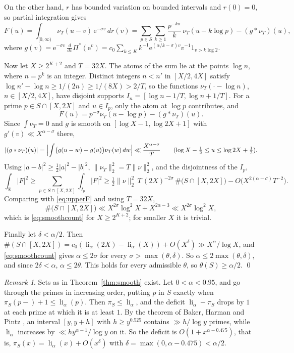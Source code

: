 \documentclass[11pt]{amsart}
\theoremstyle{remark}
\newtheorem{remark}[lemma]{Remark}
\numberwithin{equation}{section}
\newcommand{\R}{\mathbb{R}}
\newcommand{\e}{\mathrm{e}}
\DeclareMathOperator{\li}{li}
\begin{document}
On the other hand, $r$ has bounded variation on bounded intervals and $r(0)=0$, so partial integration gives
\[
F(u)=\int_{[0,\infty)}\nu_T(u-v)\,\e^{-\sigma v}\,dr(v)=\sum_{p\in S}\sum_{k\ge1}\frac{p^{-k\sigma}}{k}\,\nu_T(u-k\log p)-(g*\nu_T)(u),
\]
where $g(v)=\e^{-\sigma v}\,\frac{d}{dv}\Pi^*(\e^v)=c_0\sum_{k\le K}k^{-1}\e^{(\alpha/k-\sigma)v}v^{-1}1_{v>k\log2}$.

Now let $X\ge 2^{K+2}$ and $T=32X$. The atoms of the sum lie at the points $\log n$, where $n=p^k$ is an integer. Distinct integers $n<n'$ in $[X/2,4X]$ satisfy $\log n'-\log n\ge 1/(2n)\ge 1/(8X)>2/T$, so the functions $\nu_T(\cdot-\log n)$, $n\in[X/2,4X]$, have disjoint supports $I_n=[\log n-1/T,\log n+1/T]$. For a prime $p\in S\cap[X,2X]$ and $u\in I_p$, only the atom at $\log p$ contributes, and
\[
F(u)=p^{-\sigma}\nu_T(u-\log p)-(g*\nu_T)(u).
\]
Since $\int\nu_T=0$ and $g$ is smooth on $[\log X-1,\log2X+1]$ with $g'(v)\ll X^{\alpha-\sigma}$ there,
\[
|(g*\nu_T)(u)|=\Bigl|\int\bigl(g(u-w)-g(u)\bigr)\nu_T(w)\,dw\Bigr|\ll\frac{X^{\alpha-\sigma}}{T}\qquad(\log X-\tfrac12\le u\le\log2X+\tfrac12).
\]
Using $|a-b|^2\ge\tfrac12|a|^2-|b|^2$, $\|\nu_T\|_2^2=T\|\nu\|_2^2$, and the disjointness of the $I_p$,
\[
\int_\R|F|^2\ge\sum_{p\in S\cap[X,2X]}\int_{I_p}|F|^2\ge\tfrac12\|\nu\|_2^2\,T\,(2X)^{-2\sigma}\,\#\bigl(S\cap[X,2X]\bigr)-O\bigl(X^{2(\alpha-\sigma)}T^{-2}\bigr).
\]
Comparing with \eqref{eq:upperF} and using $T=32X$,
\[
\#\bigl(S\cap[X,2X]\bigr)\ll X^{2\sigma}\log^2X+X^{2\alpha-3}\ll X^{2\sigma}\log^2X ,
\]
which is \eqref{eq:smoothcount} for $X\ge2^{K+2}$; for smaller $X$ it is trivial.

Finally let $\delta<\alpha/2$. Then $\#(S\cap[X,2X])=c_0(\li_\alpha(2X)-\li_\alpha(X))+O(X^{\delta})\gg X^{\alpha}/\log X$, and \eqref{eq:smoothcount} gives $\alpha\le2\sigma$ for every $\sigma>\max(\theta,\delta)$. So $\alpha\le2\max(\theta,\delta)$, and since $2\delta<\alpha$, $\alpha\le2\theta$. This holds for every admissible $\theta$, so $\theta(S)\ge\alpha/2$. \qed

\begin{remark}\label{rem:exist}
Sets as in Theorem~\ref{thm:smooth} exist. Let $0<\alpha<0.95$, and go through the primes in increasing order, putting $p$ in $S$ exactly when $\pi_S(p-)+1\le\li_\alpha(p)$. Then $\pi_S\le\li_\alpha$, and the deficit $\li_\alpha-\pi_S$ drops by $1$ at each prime at which it is at least $1$. By the theorem of Baker, Harman and Pintz \cite{BHP}, an interval $[y,y+h]$ with $h\ge y^{0.525}$ contains $\gg h/\log y$ primes, while $\li_\alpha$ increases by $\ll hy^{\alpha-1}/\log y$ on it. So the deficit is $O(1+x^{\alpha-0.475})$, that is, $\pi_S(x)=\li_\alpha(x)+O(x^{\delta})$ with $\delta=\max(0,\alpha-0.475)<\alpha/2$.
\end{remark}
\end{document}
